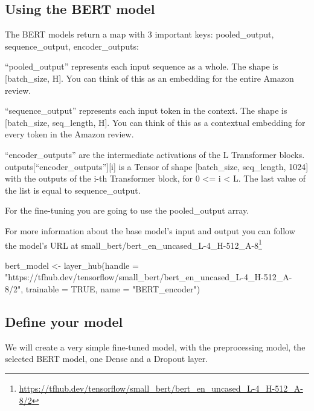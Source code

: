 \documentclass[
]{article}
\newenvironment{Shaded}{}{}
\newcommand{\AttributeTok}[1]{\textcolor[rgb]{0.49,0.56,0.16}{#1}}
\newcommand{\ConstantTok}[1]{\textcolor[rgb]{0.53,0.00,0.00}{#1}}
\newcommand{\FunctionTok}[1]{\textcolor[rgb]{0.02,0.16,0.49}{#1}}
\newcommand{\NormalTok}[1]{#1}
\newcommand{\OtherTok}[1]{\textcolor[rgb]{0.00,0.44,0.13}{#1}}
\newcommand{\StringTok}[1]{\textcolor[rgb]{0.25,0.44,0.63}{#1}}
\DeclareRobustCommand{\href}[2]{#2\footnote{\url{#1}}}
\begin{document}
\hypertarget{using-the-bert-model}{%
\subsection{Using the BERT model}\label{using-the-bert-model}}

The BERT models return a map with 3 important keys: pooled\_output,
sequence\_output, encoder\_outputs:

``pooled\_output'' represents each input sequence as a whole. The shape
is {[}batch\_size, H{]}. You can think of this as an embedding for the
entire Amazon review.

``sequence\_output'' represents each input token in the context. The
shape is {[}batch\_size, seq\_length, H{]}. You can think of this as a
contextual embedding for every token in the Amazon review.

``encoder\_outputs'' are the intermediate activations of the L
Transformer blocks. outputs{[}``encoder\_outputs''{]}{[}i{]} is a Tensor
of shape {[}batch\_size, seq\_length, 1024{]} with the outputs of the
i-th Transformer block, for 0 \textless= i \textless{} L. The last value
of the list is equal to sequence\_output.

For the fine-tuning you are going to use the pooled\_output array.

For more information about the base model's input and output you can
follow the model's URL at
\href{https://tfhub.dev/tensorflow/small_bert/bert_en_uncased_L-4_H-512_A-8/2}{small\_bert/bert\_en\_uncased\_L-4\_H-512\_A-8}

\begin{Shaded}
\begin{Highlighting}[]
\NormalTok{bert\_model }\OtherTok{\textless{}{-}} \FunctionTok{layer\_hub}\NormalTok{(}\AttributeTok{handle =} \StringTok{"https://tfhub.dev/tensorflow/small\_bert/bert\_en\_uncased\_L{-}4\_H{-}512\_A{-}8/2"}\NormalTok{,}
    \AttributeTok{trainable =} \ConstantTok{TRUE}\NormalTok{, }\AttributeTok{name =} \StringTok{"BERT\_encoder"}\NormalTok{)}
\end{Highlighting}
\end{Shaded}

\hypertarget{define-your-model}{%
\subsection{Define your model}\label{define-your-model}}

We will create a very simple fine-tuned model, with the preprocessing
model, the selected BERT model, one Dense and a Dropout layer.
\end{document}
